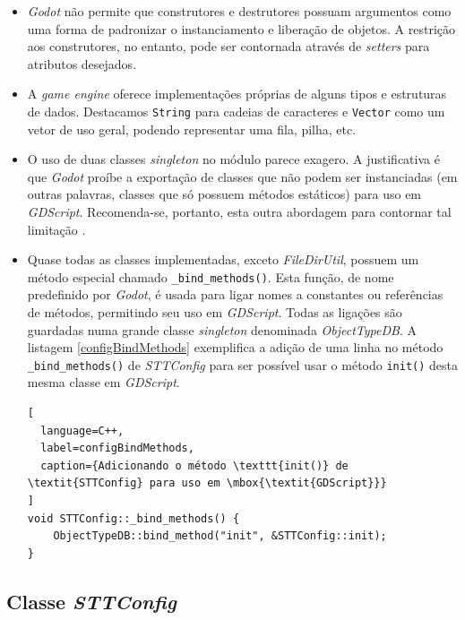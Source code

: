 \begin{itemize}
\item \textit{Godot} não permite que construtores e destrutores possuam argumentos como uma forma de padronizar o instanciamento e liberação de objetos. A restrição aos construtores, no entanto, pode ser contornada através de \textit{setters} para atributos desejados.

\item A \textit{game engine} oferece implementações próprias de alguns tipos e estruturas de dados. Destacamos \texttt{String} para cadeias de caracteres e \texttt{Vector} como um vetor de uso geral, podendo representar uma fila, pilha, etc.

\item O uso de duas classes \textit{singleton} no módulo parece exagero. A justificativa é que \textit{Godot} proíbe a exportação de classes que não podem ser instanciadas (em outras palavras, classes que só possuem métodos estáticos) para uso em \mbox{\textit{GDScript}}. Recomenda-se, portanto, esta outra abordagem para contornar tal limitação \citep{godotStaticClasses}.

\item Quase todas as classes implementadas, exceto \textit{FileDirUtil}, possuem um método especial chamado \texttt{\_bind\_methods()}. Esta função, de nome predefinido por \textit{Godot}, é usada para ligar nomes a constantes ou referências de métodos, permitindo seu uso em \mbox{\textit{GDScript}}. Todas as ligações são guardadas numa grande classe \textit{singleton} denominada \textit{ObjectTypeDB}. A listagem \ref{configBindMethods} exemplifica a adição de uma linha no método \texttt{\_bind\_methods()} de \textit{STTConfig} para ser possível usar o método \texttt{init()} desta mesma classe em \mbox{\textit{GDScript}}.

\begin{lstlisting}[
  language=C++,
  label=configBindMethods,
  caption={Adicionando o método \texttt{init()} de \textit{STTConfig} para uso em \mbox{\textit{GDScript}}}
]
void STTConfig::_bind_methods() {
    ObjectTypeDB::bind_method("init", &STTConfig::init);
}
\end{lstlisting}
\end{itemize}


\subsection{Classe \textit{STTConfig}}
\label{stt-config}

